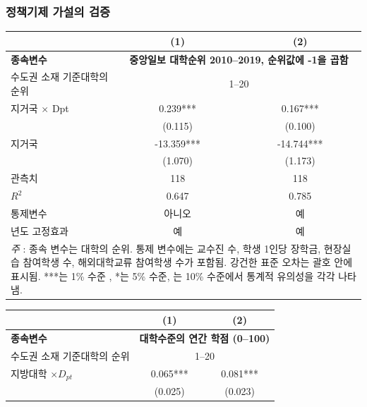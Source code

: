 \documentclass[aspectratio=169,xcolor=dvipsnames,handout]{beamer}
\begin{document}
\begin{frame}[allowframebreaks]
\frametitle{정책기제 가설의 검증}
    \begin{table}
        \tiny
        \centering
        \begin{tabular}{lcc}
        \toprule
        & (1) & (2) \\
        \midrule
        \textbf{종속변수} & \multicolumn{2}{p{3cm}}{\textbf{중앙일보 대학순위 2010--2019, 순위값에 -1을 곱함}} \\
        \midrule
        수도권 소재 기준대학의 순위 & \multicolumn{2}{c}{1--20} \\
        \midrule
        지거국 $\times$ Dpt & 0.239***   & 0.167***   \\
                        & (0.115)    & (0.100)    \\
        지거국              & -13.359*** & -14.744*** \\
                        & (1.070)    & (1.173)    \\
        \midrule
        관측치      & 118        & 118        \\
        $R^2$         & 0.647      & 0.785      \\
        통제변수          & 아니오         & 예        \\
        년도 고정효과           & 예        & 예        \\
        \bottomrule
        \multicolumn{3}{p{6cm}}{\tiny\textit{주} : 종속 변수는 대학의 순위. 통제 변수에는 교수진 수, 학생 1인당 장학금, 현장실습 참여학생 수, 해외대학교류 참여학생 수가 포함됨. 강건한 표준 오차는 괄호 안에 표시됨. ***는 1\% 수준 , *는 5\% 수준, 는 10\% 수준에서 통계적 유의성을 각각 나타냄.} \\
        \end{tabular}
    \end{table}
    \framebreak%
    \begin{table}
        \tiny
        \centering
        \begin{tabular}{lcc}
        \toprule
        & (1) & (2) \\
        \midrule
        \textbf{종속변수} & \multicolumn{2}{c}{\textbf{대학수준의 연간 학점 (0--100)}} \\
        \midrule
        수도권 소재 기준대학의 순위 & \multicolumn{2}{c}{1--20} \\
        \midrule
        지방대학 $\times D_{pt}$          & 0.065*** & 0.081*** \\
                                                & (0.025)  & (0.023)  \\

\end{tabular}
\end{table}
\end{frame}
\end{document}
